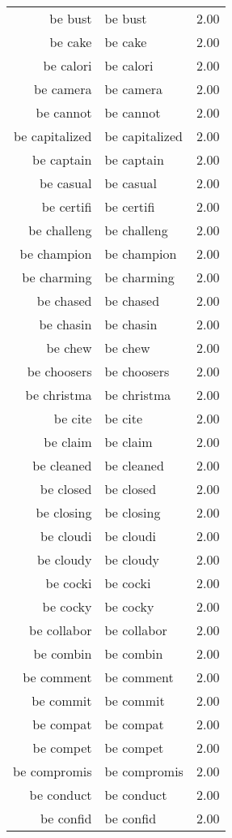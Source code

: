 \begin{table}[ht]
\begin{tabular}{rlr}
  be bust & be bust & 2.00 \\ 
  be cake & be cake & 2.00 \\ 
  be calori & be calori & 2.00 \\ 
  be camera & be camera & 2.00 \\ 
  be cannot & be cannot & 2.00 \\ 
  be capitalized & be capitalized & 2.00 \\ 
  be captain & be captain & 2.00 \\ 
  be casual & be casual & 2.00 \\ 
  be certifi & be certifi & 2.00 \\ 
  be challeng & be challeng & 2.00 \\ 
  be champion & be champion & 2.00 \\ 
  be charming & be charming & 2.00 \\ 
  be chased & be chased & 2.00 \\ 
  be chasin & be chasin & 2.00 \\ 
  be chew & be chew & 2.00 \\ 
  be choosers & be choosers & 2.00 \\ 
  be christma & be christma & 2.00 \\ 
  be cite & be cite & 2.00 \\ 
  be claim & be claim & 2.00 \\ 
  be cleaned & be cleaned & 2.00 \\ 
  be closed & be closed & 2.00 \\ 
  be closing & be closing & 2.00 \\ 
  be cloudi & be cloudi & 2.00 \\ 
  be cloudy & be cloudy & 2.00 \\ 
  be cocki & be cocki & 2.00 \\ 
  be cocky & be cocky & 2.00 \\ 
  be collabor & be collabor & 2.00 \\ 
  be combin & be combin & 2.00 \\ 
  be comment & be comment & 2.00 \\ 
  be commit & be commit & 2.00 \\ 
  be compat & be compat & 2.00 \\ 
  be compet & be compet & 2.00 \\ 
  be compromis & be compromis & 2.00 \\ 
  be conduct & be conduct & 2.00 \\ 
  be confid & be confid & 2.00 \\ 

\end{tabular}
\end{table}
